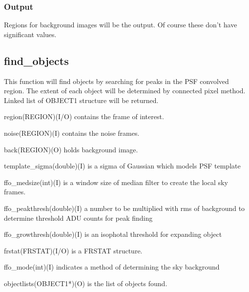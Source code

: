 \subsubsection{Output}           

Regions for background images will be the output. Of course these
don't have significant values. 

\subsection {find\_objects}

This function will find objects by searching for peaks in the PSF
convolved region. The extent of each object will be determined by
connected pixel method. Linked list of OBJECT1 structure will be
returned.

\begin{arguments}
\item{\quad region}(REGION)(I/O) contains the frame of interest.
\item{\quad noise}(REGION)(I) contains the noise frames.
\item{\quad back}(REGION)(O) holds background image.
\item{\quad template\_sigma}(double)(I) is a sigma of Gaussian which 
models PSF template
\item{\quad ffo\_medsize}(int)(I) is a window size of median
filter to create the local sky frames.
\item{\quad ffo\_peakthresh}(double)(I) a number to be multiplied
with rms of background to determine threshold ADU counts for peak
finding
\item{\quad ffo\_growthresh}(double)(I) is an isophotal threshold for
expanding object
\item{\quad frstat}(FRSTAT)(I/O) is a FRSTAT structure.
\item{\quad ffo\_mode}(int)(I) indicates a method of determining the
sky background
\item{\quad objectlists}(OBJECT1*)(O) is the list of objects found.
\end{arguments}

